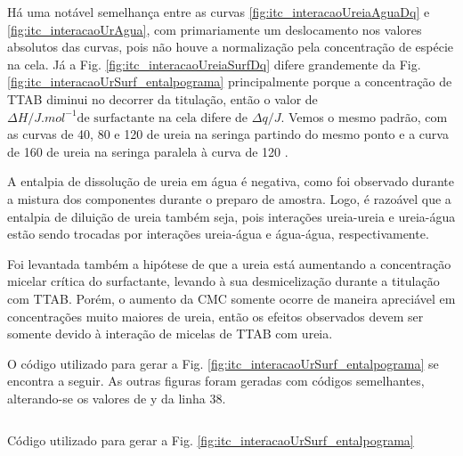 	Há uma notável semelhança entre as curvas \ref{fig:itc_interacaoUreiaAguaDq} e \ref{fig:itc_interacaoUrAgua}, com primariamente um deslocamento nos valores absolutos das curvas, pois não houve a normalização pela concentração de espécie na cela. Já a Fig. \ref{fig:itc_interacaoUreiaSurfDq} difere grandemente da Fig. \ref{fig:itc_interacaoUrSurf_entalpograma} principalmente porque a concentração de TTAB diminui no decorrer da titulação, então o valor de $\Delta H/J.mol^{-1} \text{de surfactante na cela}$ difere de $\Delta q/J$. Vemos o mesmo padrão, com as curvas de 40, 80 e 120 \mM{} de ureia na seringa partindo do mesmo ponto e a curva de 160 \mM{} de ureia na seringa paralela à curva de 120 \mM.
	
	
	A entalpia de dissolução de ureia em água é negativa, como foi observado durante a mistura dos componentes durante o preparo de amostra. Logo, é razoável que a entalpia de diluição de ureia também seja, pois interações ureia-ureia e ureia-água estão sendo trocadas por interações ureia-água e água-água, respectivamente.
	
	
	Foi levantada também a hipótese de que a ureia está aumentando a concentração micelar crítica do surfactante, levando à sua desmicelização durante a titulação com TTAB. Porém, o aumento da CMC somente ocorre de maneira apreciável em concentrações muito maiores de ureia, então os efeitos observados devem ser somente devido à interação de micelas de TTAB com ureia.
	
	O código utilizado para gerar a Fig. \ref{fig:itc_interacaoUrSurf_entalpograma} se encontra a seguir. As outras figuras foram geradas com códigos semelhantes, alterando-se os valores de y da linha 38.
	
	\begin{listing}[H]
		\inputminted{python}{./python/ITC_tratamento_ureia_ttab.py}
		\caption{Código utilizado para gerar a Fig. \ref{fig:itc_interacaoUrSurf_entalpograma}}
		\label{lst:codigo_itc_ureia}
	\end{listing}